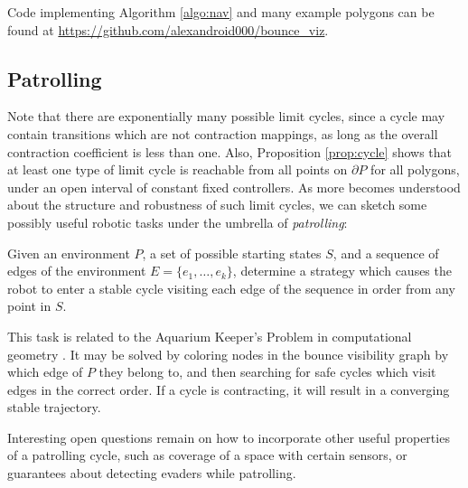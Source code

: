 \documentclass[]{styles/svproc}  %
\begin{document}
Code implementing Algorithm \ref{algo:nav} and many example polygons can be
found at \url{https://github.com/alexandroid000/bounce_viz}.



\subsection{Patrolling}

Note that there are
exponentially many possible limit cycles, since a cycle may contain
transitions which are not contraction mappings, as long as the overall
contraction coefficient is less than one. Also, Proposition \ref{prop:cycle}
shows that at least one type of limit cycle is reachable from all points on
$\partial P$ for all polygons, under an open interval of constant fixed
controllers. As more becomes understood about the structure and robustness of
such limit cycles, we can sketch some possibly useful robotic tasks under the
umbrella of {\em patrolling}:

\begin{definition}
Given an environment $P$, a set of possible starting states $S$, and
a sequence of edges of the environment $E = \{e_1, \ldots, e_k\}$,
determine a strategy which causes the robot to enter a stable cycle visiting 
each edge of the sequence in order from any point in $S$.
\end{definition}

This task is related to the Aquarium Keeper's Problem in computational
geometry \cite{czyzowicz1991aquarium}. It may be solved by coloring nodes in the
bounce visibility graph by which edge of $P$ they belong to, and then searching
for safe cycles which visit edges in the correct order. If a cycle is
contracting, it will result in a converging stable trajectory.

Interesting open questions remain on how to incorporate other useful properties of a
patrolling cycle, such as coverage of a space with certain sensors, or guarantees
about detecting evaders while patrolling.
\end{document}
